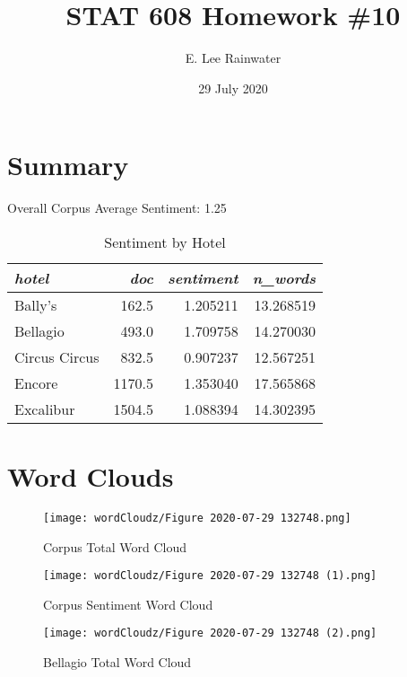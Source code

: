 \documentclass[12pt]{article}
\title{STAT 608 Homework \#10}
\author{E. Lee Rainwater}
\date{29 July 2020}
\begin{document}
\maketitle

\section{Summary}
Overall Corpus Average Sentiment: 1.25

\begin{table}[htbp]
  \centering
  \caption{Sentiment by Hotel}
   \begin{tabular}{lrrr}   
	\textit{hotel} & \textit{doc} & \textit{sentiment} & \textit{n\_words}\\	
	\hline
	Bally's &        162.5 &  1.205211 & 13.268519\\
	Bellagio &       493.0 &  1.709758 & 14.270030\\
	Circus Circus &  832.5 &  0.907237 & 12.567251\\
	Encore &        1170.5 &  1.353040 & 17.565868\\
	Excalibur &     1504.5 &  1.088394 & 14.302395\\
    \hline
    \end{tabular}%
  \label{tab:hotelSentiment}%
\end{table}%

\section{Word Clouds}


\begin{figure}[H]
	\begin{center}
	\texttt{[image: wordCloudz/Figure 2020-07-29 132748.png]}
	\caption{Corpus Total Word Cloud}
	\label{fig:corpTotWordCloud}
	\end{center}
\end{figure}

\begin{figure}
	\begin{center}
	\texttt{[image: wordCloudz/Figure 2020-07-29 132748 (1).png]}
	\caption{Corpus Sentiment Word Cloud}
	\label{fig:corpTotWordCloud}
	\end{center}
\end{figure}

\begin{figure}
	\begin{center}
	\texttt{[image: wordCloudz/Figure 2020-07-29 132748 (2).png]}
	\caption{Bellagio Total Word Cloud}
	\label{fig:corpTotWordCloud}
	\end{center}
\end{figure}
\end{document}

